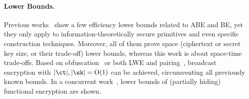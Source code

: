 \paragraph{Lower Bounds.}
Previous works~\cite{EC:BluCre94,EC:LubSta98,AC:KYDB98,AFRICACRYPT:AusKre08,AC:KatYer09,C:GayKerWee15,ITC:DLY21} show a few efficiency lower bounds related to ABE and BE,
yet they only apply to information-theoretically secure primitives and even specific construction techniques.
Moreover, all of them prove space (ciphertext or secret key size, or their trade-off) lower bounds, whereas
this work is about space-time trade-offs.
Based on obfuscation~\cite{C:BonWatZha14} or both LWE and pairing~\cite{EC:AgrYam20}, broadcast encryption with ${|\ct|,|\sk|=\bigO(1)}$ can be achieved,
circumventing all previously known bounds.
In a concurrent work~\cite{EC:JaiLinLuo23},
lower bounds of (partially hiding) functional encryption are shown.
